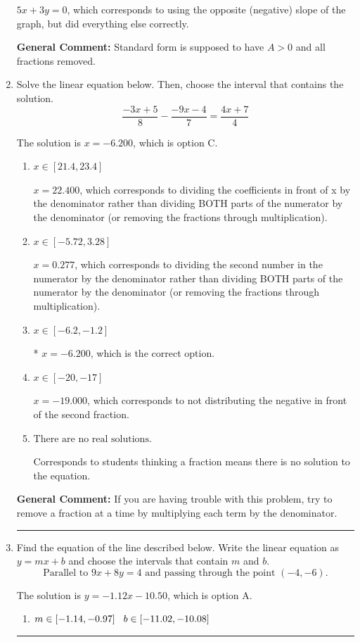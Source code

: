 \documentclass{extbook}[14pt]
\newcommand{\litem}[1]{\item #1

\rule{\textwidth}{0.4pt}}
\begin{document}
\begin{enumerate}
{\begin{enumerate}[label=\Alph*.]
 $5x + 3y = 0$, which corresponds to using the opposite (negative) slope of the graph, but did everything else correctly.
\end{enumerate}

\textbf{General Comment:} Standard form is supposed to have $A > 0$ and all fractions removed.
}
\litem{
Solve the linear equation below. Then, choose the interval that contains the solution.
\[ \frac{-3x + 5}{8} - \frac{-9x -4}{7} = \frac{4x + 7}{4} \]

The solution is \( x = -6.200 \), which is option C.\begin{enumerate}[label=\Alph*.]
\item \( x \in [21.4, 23.4] \)

 $x = 22.400$, which corresponds to dividing the coefficients in front of x by the denominator rather than dividing BOTH parts of the numerator by the denominator (or removing the fractions through multiplication).
\item \( x \in [-5.72, 3.28] \)

 $x = 0.277$, which corresponds to dividing the second number in the numerator by the denominator rather than dividing BOTH parts of the numerator by the denominator (or removing the fractions through multiplication).
\item \( x \in [-6.2, -1.2] \)

* $x = -6.200$, which is the correct option.
\item \( x \in [-20, -17] \)

 $x = -19.000$, which corresponds to not distributing the negative in front of the second fraction.
\item \( \text{There are no real solutions.} \)

Corresponds to students thinking a fraction means there is no solution to the equation.
\end{enumerate}

\textbf{General Comment:} If you are having trouble with this problem, try to remove a fraction at a time by multiplying each term by the denominator.
}
\litem{
Find the equation of the line described below. Write the linear equation as $ y=mx+b $ and choose the intervals that contain $m$ and $b$.
\[ \text{Parallel to } 9 x + 8 y = 4 \text{ and passing through the point } (-4, -6). \]

The solution is \( y = -1.12x - 10.50 \), which is option A.\begin{enumerate}[label=\Alph*.]
\item \( m \in [-1.14, -0.97] \hspace*{3mm} b \in [-11.02, -10.08] \)


\end{enumerate}}
\end{enumerate}
\end{document}
